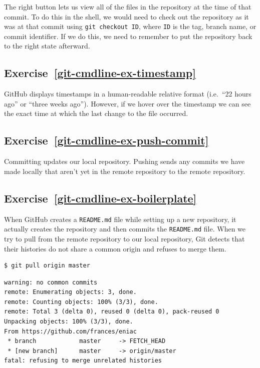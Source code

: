 \documentclass[
]{krantz}
\begin{document}
The right button lets us view all of the files in the repository at the time of that commit.
To do this in the shell,
we would need to check out the repository as it was at that commit
using \texttt{git\ checkout\ ID}, where \texttt{ID} is the tag, branch name, or commit identifier.
If we do this,
we need to remember to put the repository back to the right state afterward.

\hypertarget{exercise-refgit-cmdline-ex-timestamp}{%
\subsection*{Exercise~\ref{git-cmdline-ex-timestamp}}\label{exercise-refgit-cmdline-ex-timestamp}}


GitHub displays timestamps in a human-readable relative format
(i.e.~``22 hours ago'' or ``three weeks ago'').
However, if we hover over the timestamp
we can see the exact time at which the last change to the file occurred.

\hypertarget{exercise-refgit-cmdline-ex-push-commit}{%
\subsection*{Exercise~\ref{git-cmdline-ex-push-commit}}\label{exercise-refgit-cmdline-ex-push-commit}}


Committing updates our local repository.
Pushing sends any commits we have made locally
that aren't yet in the remote repository
to the remote repository.

\hypertarget{exercise-refgit-cmdline-ex-boilerplate}{%
\subsection*{Exercise~\ref{git-cmdline-ex-boilerplate}}\label{exercise-refgit-cmdline-ex-boilerplate}}


When GitHub creates a \texttt{README.md} file while setting up a new repository,
it actually creates the repository and then commits the \texttt{README.md} file.
When we try to pull from the remote repository to our local repository,
Git detects that their histories do not share a common origin and refuses to merge them.

\begin{verbatim}
$ git pull origin master
\end{verbatim}

\begin{verbatim}
warning: no common commits
remote: Enumerating objects: 3, done.
remote: Counting objects: 100% (3/3), done.
remote: Total 3 (delta 0), reused 0 (delta 0), pack-reused 0
Unpacking objects: 100% (3/3), done.
From https://github.com/frances/eniac
 * branch            master     -> FETCH_HEAD
 * [new branch]      master     -> origin/master
fatal: refusing to merge unrelated histories
\end{verbatim}
\end{document}
